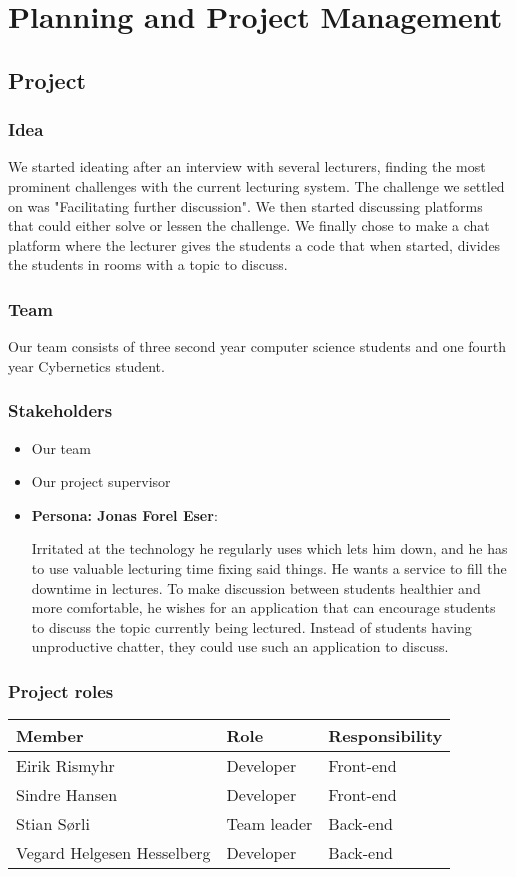 \section {Planning and Project Management}
\subsection{Project}
\subsubsection{Idea}
We started ideating after an interview with several lecturers, finding the most prominent challenges with the current lecturing system. The challenge we settled on was "Facilitating further discussion". We then started discussing platforms that could either solve or lessen the challenge. We finally chose to make a chat platform where the lecturer gives the students a code that when started, divides the students in rooms with a topic to discuss. 

\subsubsection{Team}
Our team consists of three second year computer science students and one fourth year Cybernetics student. 

\subsubsection{Stakeholders}
\begin{itemize}
    \item Our team
    \item Our project supervisor
    \item \textbf{Persona: Jonas Forel Eser}:
    
    Irritated at the technology he regularly uses which lets him down, and he has to use valuable lecturing time fixing said things. He wants a service to fill the downtime in lectures. 
    To make discussion between students healthier and more comfortable, he wishes for an application that can encourage students to discuss the topic currently being lectured. Instead of students having unproductive chatter, they could use such an application to discuss.
\end{itemize}

\subsubsection{Project roles}
\begin{adjustbox}{center}
\begin{tabular}{ l | l | l}
    Member & Role & Responsibility \\ \hline
    Eirik Rismyhr & Developer & Front-end\\ 
    Sindre Hansen & Developer & Front-end \\ 
    Stian Sørli & Team leader & Back-end\\ 
    Vegard Helgesen Hesselberg & Developer & Back-end\\ 
\end{tabular}
\end{adjustbox}

